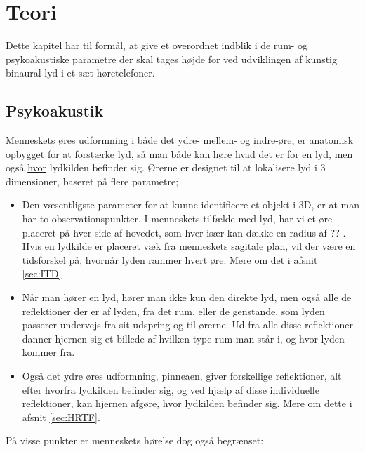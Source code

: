 \chapter{Teori}
Dette kapitel har til formål, at give et overordnet indblik i de rum- og psykoakustiske parametre der skal tages højde for ved udviklingen af kunstig binaural lyd i et sæt høretelefoner. 
 
\section{Psykoakustik}
Menneskets øres udformning i både det ydre- mellem- og indre-øre, er anatomisk opbygget for at forstærke lyd, så man både kan høre \underline{hvad} det er for en lyd, men også \underline{hvor} lydkilden befinder sig. Ørerne er designet til at lokalisere lyd i 3 dimensioner, baseret på flere parametre;

\begin{itemize}
	\item  Den væsentligste parameter for at kunne identificere et objekt i 3D, er at man har to observationspunkter. I menneskets tilfælde med lyd, har vi et øre placeret på hver side af hovedet, som hver især kan dække en radius af ?? . Hvis en lydkilde er placeret væk fra menneskets sagitale plan, vil der være en tidsforskel på, hvornår lyden rammer hvert øre. Mere om det i afsnit \ref{sec:ITD}

\item  Når man hører en lyd, hører man ikke kun den direkte lyd, men også alle de reflektioner der er af lyden, fra det rum, eller de genstande, som lyden passerer undervejs fra sit udspring og til ørerne. Ud fra alle disse reflektioner danner hjernen sig et billede af hvilken type rum man står i, og hvor lyden kommer fra. 

\item  Også det ydre øres udformning, pinneaen, giver forskellige reflektioner, alt efter hvorfra lydkilden befinder sig, og ved hjælp af disse individuelle reflektioner, kan hjernen afgøre, hvor lydkilden befinder sig. Mere om dette i afsnit \ref{sec:HRTF}.


\end{itemize}

På visse punkter er menneskets hørelse dog også begrænset:

